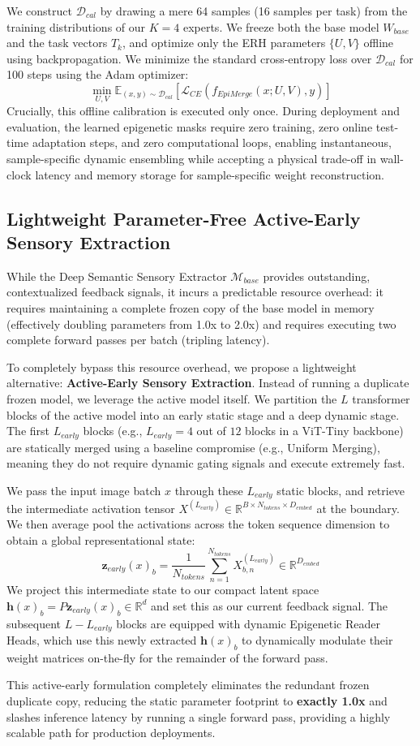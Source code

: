 We construct $\mathcal{D}_{cal}$ by drawing a mere 64 samples (16 samples per task) from the training distributions of our $K=4$ experts. We freeze both the base model $W_{base}$ and the task vectors $T_k$, and optimize only the ERH parameters $\{U, V\}$ offline using backpropagation. We minimize the standard cross-entropy loss over $\mathcal{D}_{cal}$ for 100 steps using the Adam optimizer:
\begin{equation}
    \min_{U, V} \mathbb{E}_{(x, y) \sim \mathcal{D}_{cal}} \left[ \mathcal{L}_{CE} \left( f_{EpiMerge}(x; U, V), y \right) \right]
\end{equation}
Crucially, this offline calibration is executed only once. During deployment and evaluation, the learned epigenetic masks require zero training, zero online test-time adaptation steps, and zero computational loops, enabling instantaneous, sample-specific dynamic ensembling while accepting a physical trade-off in wall-clock latency and memory storage for sample-specific weight reconstruction.

\subsection{Lightweight Parameter-Free Active-Early Sensory Extraction}
While the Deep Semantic Sensory Extractor $\mathcal{M}_{base}$ provides outstanding, contextualized feedback signals, it incurs a predictable resource overhead: it requires maintaining a complete frozen copy of the base model in memory (effectively doubling parameters from 1.0x to 2.0x) and requires executing two complete forward passes per batch (tripling latency).

To completely bypass this resource overhead, we propose a lightweight alternative: \textbf{Active-Early Sensory Extraction}. Instead of running a duplicate frozen model, we leverage the active model itself. We partition the $L$ transformer blocks of the active model into an early static stage and a deep dynamic stage. The first $L_{early}$ blocks (e.g., $L_{early}=4$ out of $12$ blocks in a ViT-Tiny backbone) are statically merged using a baseline compromise (e.g., Uniform Merging), meaning they do not require dynamic gating signals and execute extremely fast.

We pass the input image batch $x$ through these $L_{early}$ static blocks, and retrieve the intermediate activation tensor $X^{(L_{early})} \in \mathbb{R}^{B \times N_{tokens} \times D_{embed}}$ at the boundary. We then average pool the activations across the token sequence dimension to obtain a global representational state:
\begin{equation}
    \mathbf{z}_{early}(x)_b = \frac{1}{N_{tokens}} \sum_{n=1}^{N_{tokens}} X_{b, n}^{(L_{early})} \in \mathbb{R}^{D_{embed}}
\end{equation}
We project this intermediate state to our compact latent space $\mathbf{h}(x)_b = P \mathbf{z}_{early}(x)_b \in \mathbb{R}^d$ and set this as our current feedback signal. The subsequent $L - L_{early}$ blocks are equipped with dynamic Epigenetic Reader Heads, which use this newly extracted $\mathbf{h}(x)_b$ to dynamically modulate their weight matrices on-the-fly for the remainder of the forward pass.

This active-early formulation completely eliminates the redundant frozen duplicate copy, reducing the static parameter footprint to \textbf{exactly 1.0x} and slashes inference latency by running a single forward pass, providing a highly scalable path for production deployments.

